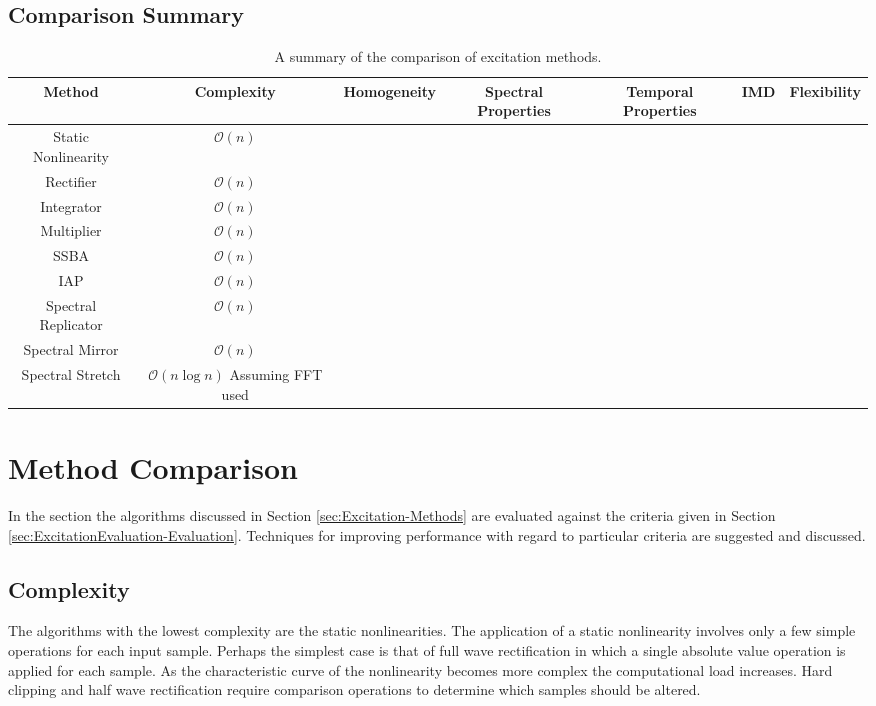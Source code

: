 \begin{landscape}
\section{Comparison Summary}
\label{sec:ExcitationEvaluation-Summary}

	\begin{table}[h!]
		\centering
		\begin{tabular}{|c|c|c|c|c|c|c|}
			\hline
			\bf{Method} & \bf{Complexity} & \bf{Homogeneity} & \bf{Spectral Properties} & 
		 	\bf{Temporal Properties} & \bf{IMD} & \bf{Flexibility} \tabularnewline %
			\hline
			\hline
			Static Nonlinearity & $\mathcal{O}(n)$ & & & & & \tabularnewline
			\hline
			Rectifier & $\mathcal{O}(n)$ & & & & & \tabularnewline
			\hline
			Integrator & $\mathcal{O}(n)$ & & & & & \tabularnewline
			\hline
			Multiplier & $\mathcal{O}(n)$ & & & & & \tabularnewline
			\hline
			SSBA & $\mathcal{O}(n)$ & & & & & \tabularnewline
			\hline
			IAP & $\mathcal{O}(n)$ & & & & & \tabularnewline
			\hline
			Spectral Replicator & $\mathcal{O}(n)$ & & & & & \tabularnewline
			\hline
			Spectral Mirror & $\mathcal{O}(n)$ & & & & & \tabularnewline
			\hline
			Spectral Stretch & $\mathcal{O}(n\log{n})$ Assuming FFT used & & & & & \tabularnewline
			\hline
		\end{tabular}
		\caption{A summary of the comparison of excitation methods.}
		\label{tab:ComparisonSummary}
	\end{table}

\end{landscape}

\section{Method Comparison}
\label{sec:ExcitationEvaluation-Comparison}
	In the section the algorithms discussed in Section \ref{sec:Excitation-Methods} are evaluated against the criteria
	given in Section \ref{sec:ExcitationEvaluation-Evaluation}. Techniques for improving performance with regard to
	particular criteria are suggested and discussed. 

	\subsection{Complexity}
	\label{sec:ExcitationEvaluation-Comparison-Complexity}
		The algorithms with the lowest complexity are the static nonlinearities. The application of a static
		nonlinearity involves only a few simple operations for each input sample. Perhaps the simplest case is that
		of full wave rectification in which a single absolute value operation is applied for each sample. As the
		characteristic curve of the nonlinearity becomes more complex the computational load increases. Hard
		clipping and half wave rectification require comparison operations to determine which samples should be
		altered. 

